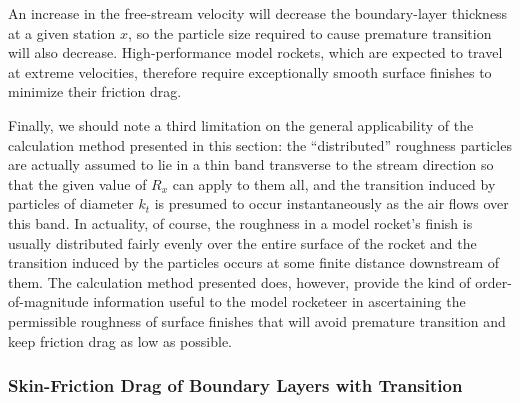 An increase in the free-stream velocity will decrease the
boundary-layer thickness at a given station $x$, so the particle
size required to cause premature transition will also decrease.
High-performance model rockets, which are expected to travel
at extreme velocities, therefore require exceptionally smooth
surface finishes to minimize their friction drag.

Finally, we should note a third limitation on the general
applicability of the calculation method presented in this section:
the ``distributed'' roughness particles are actually assumed to
lie in a thin band transverse to the stream direction so that
the given value of $R_x$ can apply to them all, and the transition
induced by particles of diameter $k_t$ is presumed to occur instantaneously
as the air flows over this band. In actuality, of
course, the roughness in a model rocket's finish is usually
distributed fairly evenly over the entire surface of the rocket
and the transition induced by the particles occurs at some
finite distance downstream of them. The calculation method
presented does, however, provide the kind of order-of-magnitude
information useful to the model rocketeer in ascertaining the
permissible roughness of surface finishes that will avoid
premature transition and keep friction drag as low as possible.

\subsubsection{Skin-Friction Drag of Boundary Layers with Transition}\label{ch3:sec:3.5.3}

